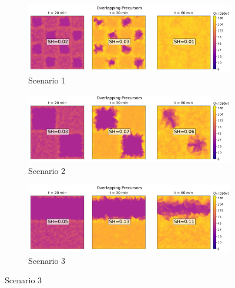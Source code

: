\begin{figure}[h]
  \centering
  \begin{subfigure}
    \centering
    \includegraphics[width=\textwidth]{figures/ozone_cross_section_fx2fy2_overlapTrue.png}
    \caption{Scenario 1}
  \end{subfigure}
     \vspace*{5mm} 
  \begin{subfigure}
    \centering
    \includegraphics[width=\textwidth]{figures/ozone_cross_section_fx1fy1_overlapTrue.png}
    \caption{Scenario 2}
  \end{subfigure}
   \vspace*{5mm} 
  \begin{subfigure}
    \centering
    \includegraphics[width=\textwidth]{figures/ozone_cross_section_fx1fy0_overlapTrue.png}
    \caption{Scenario 3}
  \end{subfigure}
\end{figure}

